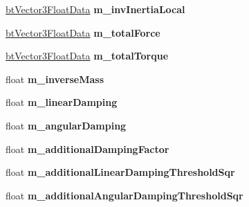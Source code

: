 \begin{DoxyCompactItemize}
\item 
\hypertarget{structbt_rigid_body_float_data_a70d3994ba3bd1c309231645c657f99d2}{\hyperlink{structbt_vector3_float_data}{bt\+Vector3\+Float\+Data} {\bfseries m\+\_\+inv\+Inertia\+Local}}\label{structbt_rigid_body_float_data_a70d3994ba3bd1c309231645c657f99d2}

\item 
\hypertarget{structbt_rigid_body_float_data_a52b68d81e9a94d40b49a2ebd6fd8e9e2}{\hyperlink{structbt_vector3_float_data}{bt\+Vector3\+Float\+Data} {\bfseries m\+\_\+total\+Force}}\label{structbt_rigid_body_float_data_a52b68d81e9a94d40b49a2ebd6fd8e9e2}

\item 
\hypertarget{structbt_rigid_body_float_data_a405857f125beda9bcbe3d77481bcdd6c}{\hyperlink{structbt_vector3_float_data}{bt\+Vector3\+Float\+Data} {\bfseries m\+\_\+total\+Torque}}\label{structbt_rigid_body_float_data_a405857f125beda9bcbe3d77481bcdd6c}

\item 
\hypertarget{structbt_rigid_body_float_data_ae08730abd56750461bb88aac3c064568}{float {\bfseries m\+\_\+inverse\+Mass}}\label{structbt_rigid_body_float_data_ae08730abd56750461bb88aac3c064568}

\item 
\hypertarget{structbt_rigid_body_float_data_a22781217674076f42f70368097dde3a2}{float {\bfseries m\+\_\+linear\+Damping}}\label{structbt_rigid_body_float_data_a22781217674076f42f70368097dde3a2}

\item 
\hypertarget{structbt_rigid_body_float_data_aecb3ccda7232a1e2628125b3e191b8ff}{float {\bfseries m\+\_\+angular\+Damping}}\label{structbt_rigid_body_float_data_aecb3ccda7232a1e2628125b3e191b8ff}

\item 
\hypertarget{structbt_rigid_body_float_data_ad7ca6e8eec406b80b5338a02c6957c81}{float {\bfseries m\+\_\+additional\+Damping\+Factor}}\label{structbt_rigid_body_float_data_ad7ca6e8eec406b80b5338a02c6957c81}

\item 
\hypertarget{structbt_rigid_body_float_data_a7cfb604e6d732e652f2e3cc20bb6750a}{float {\bfseries m\+\_\+additional\+Linear\+Damping\+Threshold\+Sqr}}\label{structbt_rigid_body_float_data_a7cfb604e6d732e652f2e3cc20bb6750a}

\item 
\hypertarget{structbt_rigid_body_float_data_afdcfc3b4015f10ca38d194833d8c887a}{float {\bfseries m\+\_\+additional\+Angular\+Damping\+Threshold\+Sqr}}\label{structbt_rigid_body_float_data_afdcfc3b4015f10ca38d194833d8c887a}


\end{DoxyCompactItemize}
